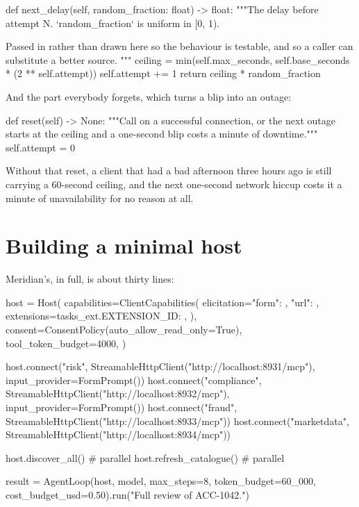 \begin{py}
def next_delay(self, random_fraction: float) -> float:
    """The delay before attempt N. `random_fraction` is uniform in [0, 1).

    Passed in rather than drawn here so the behaviour is testable, and so a
    caller can substitute a better source.
    """
    ceiling = min(self.max_seconds, self.base_seconds * (2 ** self.attempt))
    self.attempt += 1
    return ceiling * random_fraction
\end{py}

And the part everybody forgets, which turns a blip into an outage:

\begin{py}
def reset(self) -> None:
    """Call on a successful connection, or the next outage starts at the
    ceiling and a one-second blip costs a minute of downtime."""
    self.attempt = 0
\end{py}

Without that reset, a client that had a bad afternoon three hours ago is still
carrying a 60-second ceiling, and the next one-second network hiccup costs it a
minute of unavailability for no reason at all.

\section{Building a minimal host}

Meridian's, in full, is about thirty lines:

\begin{py}
host = Host(
    capabilities=ClientCapabilities(
        elicitation={"form": {}, "url": {}},
        extensions={tasks_ext.EXTENSION_ID: {}},
    ),
    consent=ConsentPolicy(auto_allow_read_only=True),
    tool_token_budget=4000,
)

host.connect("risk", StreamableHttpClient("http://localhost:8931/mcp"),
             input_provider=FormPrompt())
host.connect("compliance", StreamableHttpClient("http://localhost:8932/mcp"),
             input_provider=FormPrompt())
host.connect("fraud", StreamableHttpClient("http://localhost:8933/mcp"))
host.connect("marketdata", StreamableHttpClient("http://localhost:8934/mcp"))

host.discover_all()        # parallel
host.refresh_catalogue()   # parallel

result = AgentLoop(host, model, max_steps=8,
                   token_budget=60_000,
                   cost_budget_usd=0.50).run("Full review of ACC-1042.")
\end{py}

